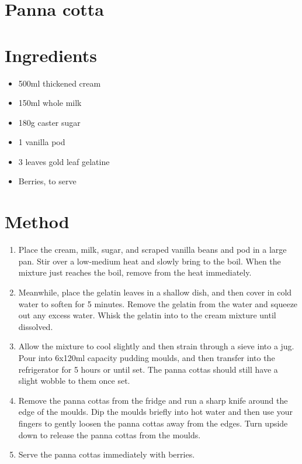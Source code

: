 \section{Panna cotta}

\section{Ingredients}
\begin{itemize}
        \item 500ml thickened cream
        \item 150ml whole milk
        \item 180g caster sugar
	\item 1 vanilla pod
	\item 3 leaves gold leaf gelatine
	\item Berries, to serve
\end{itemize}

\section{Method}

\begin{enumerate}
\item Place the cream, milk, sugar, and scraped vanilla beans and pod in a large pan. Stir over a low-medium heat and slowly bring to the boil. When the mixture just reaches the boil, remove from the heat immediately.
\item Meanwhile, place the gelatin leaves in a shallow dish, and then cover in cold water to soften for 5 minutes. Remove the gelatin from the water and squeeze out any excess water. Whisk the gelatin into to the cream mixture until dissolved.
\item Allow the mixture to cool slightly and then strain through a sieve into a jug. Pour into 6x120ml capacity pudding moulds, and then transfer into the refrigerator for 5 hours or until set. The panna cottas should still have a slight wobble to them once set.
\item Remove the panna cottas from the fridge and run a sharp knife around the edge of the moulds. Dip the moulds briefly into hot water and then use your fingers to gently loosen the panna cottas away from the edges. Turn upside down to release the panna cottas from the moulds.
\item Serve the panna cottas immediately with berries. 
\end{enumerate}

